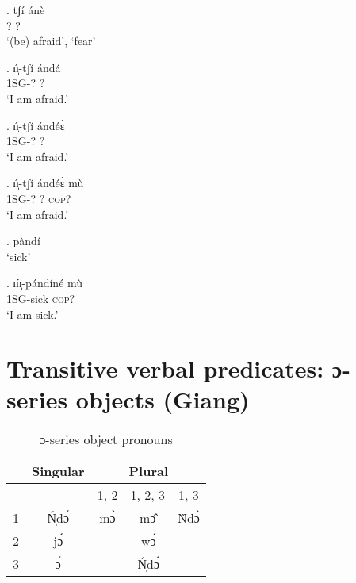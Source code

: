 \documentclass{assets/fieldnotes}
\begin{document}
\exg. tʃí ánè\\
? ?\\
`(be) afraid’, `fear’

\exg. ń̩-tʃí ándá\\
\textsc{1SG}-? ?\\
`I am afraid.’

\exg. ń̩-tʃí ándéɛ̀\\
\textsc{1SG}-? ?\\
`I am afraid.’

\exg. ń̩-tʃí ándéɛ̀ mù\\
\textsc{1SG}-? ? \textsc{cop?}\\
`I am afraid.’

\ex. pàndí\\
`sick’

\exg. ḿ̩-pándíné mù\\
\textsc{1SG}-sick \textsc{cop?}\\
`I am sick.’

\section{Transitive verbal predicates: ɔ-series objects (Giang)}  



\begin{table}
    \centering
    \begin{tabular}{ccccc}
        \toprule
        & Singular & \multicolumn{3}{c}{Plural} \\
        \toprule 
        & & 1, 2 & 1, 2, 3 & 1, 3 \\  
        \cmidrule(r){3-3}
        \cmidrule(r){4-4} 
        \cmidrule(r){5-5}
        1 & Ń̩dɔ́ & mɔ̀ & mɔ̂ & Ǹdɔ̀ \\
        \midrule
        2 & jɔ́ & \multicolumn{3}{c}{wɔ́} \\
        \midrule
        3 & ɔ́ & \multicolumn{3}{c}{Ń̩dɔ́}\\
        \bottomrule
    \end{tabular}
    \caption{ɔ-series object pronouns}
    \label{tab:fut}
\end{table} 

\end{document}
